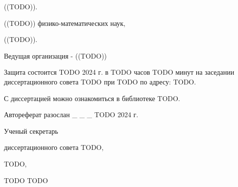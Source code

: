\documentclass[12pt]{article}
\begin{document}
\hspace{25mm}((TODO)).

\vspace{10mm}

\hspace{25mm}((TODO)) физико-математических наук,

\hspace{25mm}((TODO)).


\bigskip

Ведущая организация - ((TODO))

\vspace{10mm}

Защита состоится TODO 2024 г. в TODO часов TODO минут на
заседании диссертационного совета TODO при TODO по адресу:
TODO.

\vspace{5mm}

С диссертацией можно ознакомиться в библиотеке TODO.

\vspace{10mm}

Автореферат разослан \_ \_ \_ TODO 2024 г.

\vspace{10mm}

Ученый секретарь

\noindent диссертационного совета TODO,

\noindent TODO,

\noindent TODO \hspace{110mm}TODO
\end{document}
